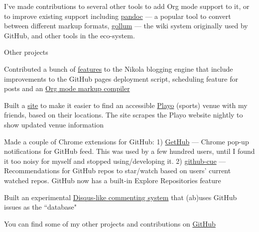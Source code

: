 \begin{cventries}
{\begin{cvitems}
        \item I've made contributions to several other tools to add Org mode support to it, or to improve existing support including \href{https://github.com/jgm/pandoc/commits?author=punchagan}{pandoc} --- a popular tool to convert between different markup formats, \href{https://github.com/gollum/gollum/commits?author=punchagan}{gollum} --- the wiki system originally used by GitHub, and other tools in the eco-system.
        \end{cvitems}
      }
  \cventry
      {Other projects}
      {}
      {} %
      {} %
      {
        \begin{cvitems} %
        \item {Contributed a bunch of \href{https://github.com/getnikola/nikola/commits?author=punchagan}{features} to the Nikola blogging engine that include improvements to the GitHub pages deployment script, scheduling feature for posts and an \href{https://github.com/getnikola/plugins/tree/master/v8/orgmode}{Org mode markup compiler}}
        \item {Built a \href{https://punchagan.github.io/playo-find-venue/}{site} to make it easier to find an accessible \href{https://playo.co/}{Playo} (sports) venue with my friends, based on their locations. The site scrapes the Playo website nightly to show updated venue information}
        \item {Made a couple of Chrome extensions for GitHub: 1) \href{https://github.com/punchagan/GetHub}{GetHub} --- Chrome pop-up notifications for GitHub feed. This was used by a few hundred users, until I found it too noisy for myself and stopped using/developing it. 2) \href{https://github.com/punchagan/github-cue}{github-cue} --- Recommendations for GitHub repos to star/watch based on users' current watched repos. GitHub now has a built-in Explore Repositories feature}
        \item {Built an experimental \href{https://github.com/punchagan/crumb}{Disqus-like commenting system} that (ab)uses GitHub issues as the ``database"}
        \item {You can find some of my other projects and contributions on \href{https://github.com/punchagan}{GitHub}}
        \end{cvitems}
      }
\end{cventries}
